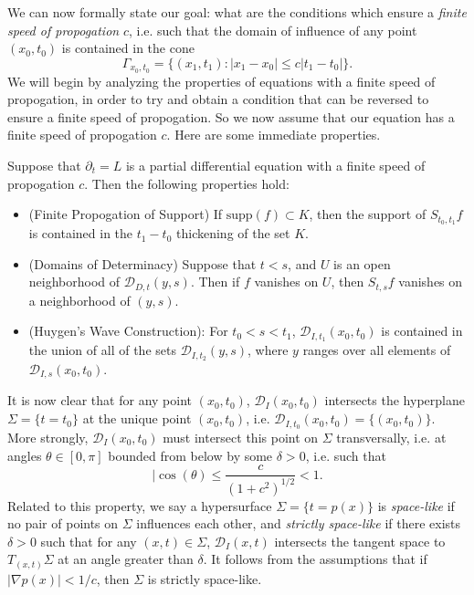 We can now formally state our goal: what are the conditions which ensure a \emph{finite speed of propogation} $c$, i.e. such that the domain of influence of any point $(x_0,t_0)$ is contained in the cone
%
\[ \Gamma_{x_0,t_0} = \{ (x_1,t_1): |x_1 - x_0| \leq c |t_1 - t_0| \}. \]
%
We will begin by analyzing the properties of equations with a finite speed of propogation, in order to try and obtain a condition that can be reversed to ensure a finite speed of propogation. So we now assume that our equation has a finite speed of propogation $c$. Here are some immediate properties.

\begin{theorem}
	Suppose that $\partial_t = L$ is a partial differential equation with a finite speed of propogation $c$. Then the following properties hold:
	\begin{itemize}
		\item (Finite Propogation of Support) If $\text{supp}(f) \subset K$, then the support of $S_{t_0,t_1} f$ is contained in the $t_1 - t_0$ thickening of the set $K$.
		\item (Domains of Determinacy) Suppose that $t < s$, and $U$ is an open neighborhood of $\mathcal{D}_{D,t}(y,s)$. Then if $f$ vanishes on $U$, then $S_{t,s} f$ vanishes on a neighborhood of $(y,s)$.
		\item (Huygen's Wave Construction): For $t_0 < s < t_1$, $\mathcal{D}_{I,t_1}(x_0,t_0)$ is contained in the union of all of the sets $\mathcal{D}_{I,t_2}(y,s)$, where $y$ ranges over all elements of $\mathcal{D}_{I,s}(x_0,t_0)$.
	\end{itemize}
\end{theorem}

It is now clear that for any point $(x_0,t_0)$, $\mathcal{D}_I(x_0,t_0)$ intersects the hyperplane $\Sigma = \{ t = t_0 \}$ at the unique point $(x_0,t_0)$, i.e. $\mathcal{D}_{I,t_0}(x_0,t_0) = \{ (x_0,t_0) \}$. More strongly, $\mathcal{D}_I(x_0,t_0)$ must intersect this point on $\Sigma$ transversally, i.e. at angles $\theta \in [0,\pi]$ bounded from below by some $\delta > 0$, i.e. such that
%
\[ |\cos(\theta) \leq \frac{c}{(1 + c^2)^{1/2}} < 1. \]
%
Related to this property, we say a hypersurface $\Sigma = \{ t = p(x) \}$ is \emph{space-like} if no pair of points on $\Sigma$ influences each other, and \emph{strictly space-like} if there exists $\delta > 0$ such that for any $(x,t) \in \Sigma$, $\mathcal{D}_I(x,t)$ intersects the tangent space to $T_{(x,t)} \Sigma$ at an angle greater than $\delta$. It follows from the assumptions that if $|\nabla p(x)| < 1/c$, then $\Sigma$ is strictly space-like.




